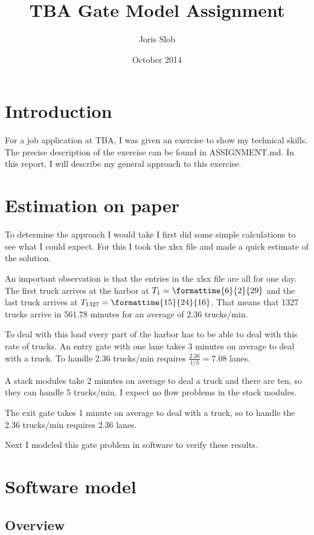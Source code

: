 \documentclass{article}
\begin{document}
\title{TBA Gate Model Assignment}
\author{Joris Slob}
\date{October 2014}
\maketitle

\section{Introduction}

For a job application at TBA, I was given an exercise to show my
technical skills. The precise description of the exercise can be found
in ASSIGNMENT.md. In this report, I will describe my general approach
to this exercise.

\section{Estimation on paper}

To determine the approach I would take I first did some simple
calculations to see what I could expect. For this I took the xlsx file
and made a quick estimate of the solution.

An important observation is that the entries in the xlsx file are all
for one day. The first truck arrives at the harbor at $T_1 =
\mbox{\formattime{6}{2}{29}}$ and the last truck arrives at $T_{1327}
= \mbox{\formattime{15}{24}{16}}$. That means that 1327 trucks arrive
in 561.78 minutes for an average of 2.36 trucks/min.

To deal with this load every part of the harbor has to be able to deal
with this rate of trucks. An entry gate with one lane takes 3 minutes
on average to deal with a truck. To handle 2.36 trucks/min requires
$\frac{2.36}{1/3} = 7.08$ lanes.

A stack modules take 2 minutes on average to deal a truck and there
are ten, so they can handle 5 trucks/min. I expect no flow problems in
the stack modules.

The exit gate takes 1 minute on average to deal with a truck, so to
handle the 2.36 trucks/min requires 2.36 lanes.

Next I modeled this gate problem in software to verify these results.

\section{Software model}

\subsection{Overview}
\end{document}
